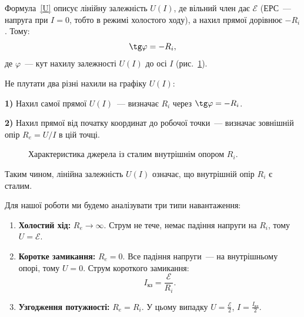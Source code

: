\documentclass{LabWork}
\begin{document}
Формула~\eqref{U} описує лінійну залежність $U(I)$, де вільний член дає $\mathcal{E}$ (ЕРС~--- напруга при $I=0$, тобто в режимі холостого ходу), а нахил прямої дорівнює $-R_i$. Тому:
\begin{equation}\label{tan}
	\tg\varphi = - R_i,
\end{equation}
де $\varphi$~--- кут нахилу залежності $U(I)$ до осі $I$ (рис.~\ref{pic2}).

\begin{NoteBox}
Не плутати два різні нахили на графіку $U(I)$:\par
\textbf{1)} Нахил самої прямої $U(I)$~--- визначає $R_i$ через $\tg\varphi = -R_i$.\par
\textbf{2)} Нахил прямої від початку координат до робочої точки~--- визначає зовнішній опір $R_e = U/I$ в цій точці.
\end{NoteBox}

\begin{figure}[h!]\centering
	\caption{Характеристика джерела із сталим внутрішнім опором $R_i$.}
	\label{pic2}
\end{figure}

Таким чином, лінійна залежність $U(I)$ означає, що внутрішній опір $R_i$ є сталим.

Для нашої роботи ми будемо аналізувати три типи навантаження:

\begin{enumerate}
	\item \textbf{Холостий хід:} $R_e \to \infty$. Струм не тече, немає падіння напруги на $R_i$, тому $U = \mathcal{E}$.
	\item \textbf{Коротке замикання:} $R_e=0$. Все падіння напруги~--- на внутрішньому опорі, тому $U = 0$. Струм короткого замикання:
	      \begin{equation}\label{short}
		      I_\text{кз}=\frac{\mathcal{E}}{R_i}.
	      \end{equation}
	\item \textbf{Узгодження потужності:} $R_e=R_i$. У цьому випадку $U = \frac{\mathcal{E}}{2}$, $I=\frac{I_\text{кз}}{2}$.
\end{enumerate}
\end{document}
